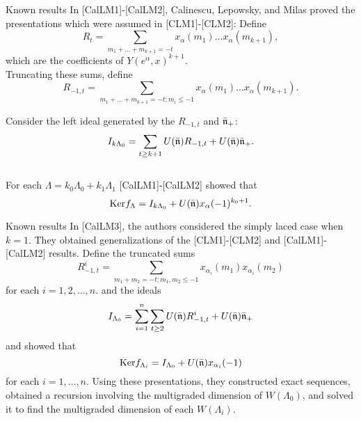 \documentclass{beamer}
\begin{document}
\begin{frame}{Known results}
In [CalLM1]-[CalLM2], Calinescu, Lepowsky, and Milas proved the presentations which were assumed in [CLM1]-[CLM2]:
Define
$$R_{t} = \sum_{m_1 + \dots + m_{k+1} = -t}x_{\alpha}(m_1)\dots x_{\alpha}(m_{k+1}),$$
which are the coefficients of $Y(e^{\alpha},x)^{k+1}$.\\
\vspace{0.1in}
\pause
Truncating these sums, define
$$R_{-1,t} = \sum_{m_1 + \dots + m_{k+1} = -t ; m_i \le -1}x_{\alpha}(m_1)\dots x_{\alpha}(m_{k+1}).$$

Consider the left ideal generated by the  $R_{-1,t}$ and $\bar{\frak{n}}_+$:
$$I_{k\Lambda_0} = \sum_{t \ge k+1}U(\bar{\frak{n}})R_{-1,t} + U(\bar{\frak{n}})\bar{\frak{n}}_+.$$\\
\pause
For each $\Lambda = k_0 \Lambda_0 + k_1 \Lambda_1$ [CalLM1]-[CalLM2] showed that 
$$\mbox{Ker}f_\Lambda = I_{k\Lambda_0} + U(\bar{\frak{n}})x_{\alpha}(-1)^{k_0+1}.$$

\end{frame}
\begin{frame}{Known results}
In [CalLM3], the authors considered the simply laced case when $k=1$. They obtained generalizations of the [CLM1]-[CLM2] and [CalLM1]-[CalLM2] results.
\pause
Define the truncated sums
$$R_{-1,t}^i = \sum_{m_1+m_2 = -t ;m_1,m_2 \le -1}x_{\alpha_i}(m_1)x_{\alpha_i}(m_2)$$
for each $i=1,2,\dots, n$.
and the ideals
$$I_{\Lambda_0} = \sum_{i=1}^n \sum_{t \ge 2} U(\bar{\frak{n}})R_{-1,t}^i + U(\bar{\frak{n}})\bar{\frak{n}}_+$$
and showed that
$$\mbox{Ker}f_{\Lambda_i} = I_{\Lambda_0} + U(\bar{\frak{n}})x_{\alpha_i}(-1)$$
for each $i=1,\dots,n$. Using these presentations, they constructed exact sequences, obtained a recursion involving
the multigraded dimension of $W(\Lambda_0)$,
and solved it to find the multigraded dimension of each $W(\Lambda_i)$.
\end{frame}

\end{document}
